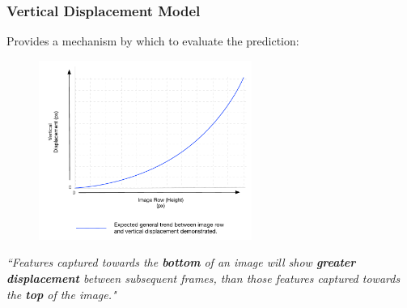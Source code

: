 \documentclass[10pt, compress]{beamer}
\begin{document}
\begin{frame}[fragile]
  \frametitle{Vertical Displacement Model}
  
  \vspace{-35pt}

 Provides a mechanism by which to evaluate the prediction:
 
 \vspace{15pt}
 
       \begin{figure}
   \vspace{-30pt}
  \begin{center}
    \includegraphics[width=0.62\textwidth]{model.pdf}
  \end{center}
  \end{figure}
   
   
  \textit{``Features captured towards the \textbf{bottom} of an image will show \textbf{greater displacement} between subsequent frames, than those features captured towards the \textbf{top} of the image."}
   
\end{frame}
\end{document}
